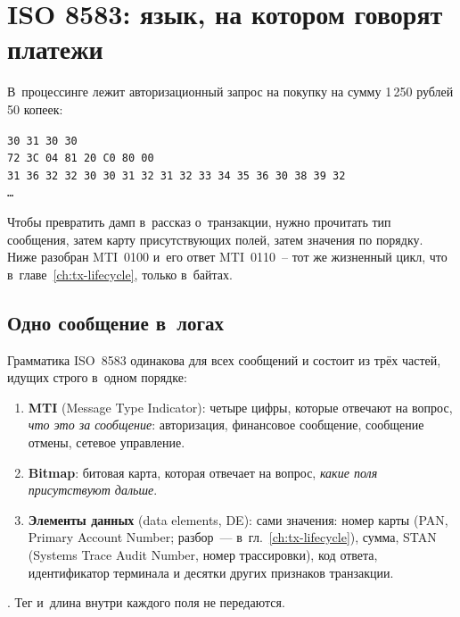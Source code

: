 
\chapter{ISO 8583: язык, на котором говорят платежи}\label{ch:iso8583}
В~процессинге лежит авторизационный запрос на покупку на сумму
1\,250 рублей 50 копеек:

\begin{center}
  \small
  \texttt{30 31 30 30}\\[2pt]
  \texttt{72 3C 04 81 20 C0 80 00}\\[2pt]
  \texttt{31 36 32 32 30 30 31 32 31 32 33 34 35 36 30 38 39 32}\\[2pt]
  \texttt{\ldots}
\end{center}

Чтобы превратить дамп в~рассказ о~транзакции, нужно прочитать тип сообщения, затем карту присутствующих полей, затем значения по порядку.
Ниже разобран MTI~0100 и~его ответ MTI~0110~-- тот же жизненный цикл, что в~главе~\ref{ch:tx-lifecycle}, только в~байтах.

\section{Одно сообщение в~логах}\label{sec:iso8583-structure}

Грамматика ISO~8583 одинакова для всех сообщений и состоит из трёх частей, идущих строго в~одном порядке:

\begin{enumerate}
  \item \textbf{MTI} (Message Type Indicator): четыре цифры,
    которые отвечают на вопрос, \emph{что это за сообщение}:
    авторизация, финансовое сообщение, сообщение отмены,
    сетевое
    управление.
  \item \textbf{Bitmap}: битовая карта, которая отвечает
    на вопрос, \emph{какие поля присутствуют дальше}.
  \item \textbf{Элементы данных} (data elements, DE): сами значения: номер карты
    (PAN, Primary Account Number; разбор~--- в~гл.~\ref{ch:tx-lifecycle}),
    сумма, STAN (Systems Trace Audit Number, номер трассировки),
    код ответа, идентификатор терминала
    и десятки других признаков транзакции.
\end{enumerate}

. Тег и~длина внутри каждого поля не передаются.

